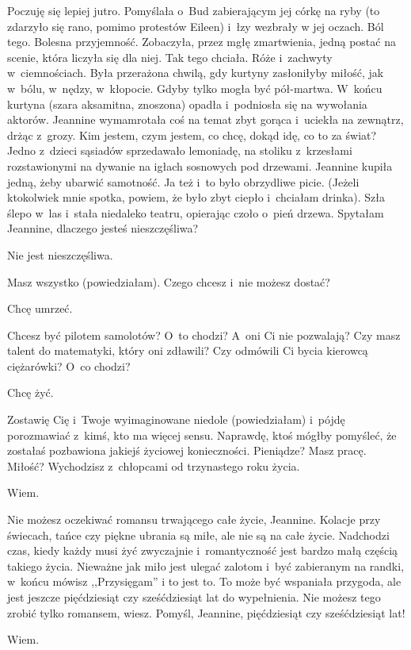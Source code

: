 \documentclass[oneside,polish,12pt,sfheadings]{mwbk}
\begin{document}
Poczuję się lepiej jutro. Pomyślała o~Bud zabierającym jej córkę na
ryby (to zdarzyło się rano, pomimo protestów Eileen) i~łzy wezbrały
w jej oczach. Ból tego. Bolesna przyjemność. Zobaczyła, przez mgłę
zmartwienia, jedną postać na scenie, która liczyła się dla niej. Tak
tego chciała. Róże i~zachwyty w~ciemnościach. Była przerażona chwilą,
gdy kurtyny zasłoniłyby miłość, jak w~bólu, w~nędzy, w~kłopocie. Gdyby
tylko mogła być pół-martwa. W~końcu kurtyna (szara aksamitna, znoszona)
opadła i~podniosła się na wywołania aktorów. Jeannine wymamrotała
coś na temat zbyt gorąca i~uciekła na zewnątrz, drżąc z~grozy. Kim
jestem, czym jestem, co chcę, dokąd idę, co to za świat? Jedno z~dzieci
sąsiadów sprzedawało lemoniadę, na stoliku z~krzesłami rozstawionymi
na dywanie na igłach sosnowych pod drzewami. Jeannine kupiła jedną,
żeby ubarwić samotność. Ja też i~to było obrzydliwe picie. (Jeżeli
ktokolwiek mnie spotka, powiem, że było zbyt ciepło i~chciałam drinka).
Szła ślepo w~las i~stała niedaleko teatru, opierając czoło o~pień
drzewa. Spytałam Jeannine, dlaczego jesteś nieszczęśliwa?

Nie jest nieszczęśliwa.

Masz wszystko (powiedziałam). Czego chcesz i~nie możesz dostać?

Chcę umrzeć.

Chcesz być pilotem samolotów? O~to chodzi? A~oni Ci nie pozwalają?
Czy masz talent do matematyki, który oni zdławili? Czy odmówili Ci
bycia kierowcą ciężarówki? O~co chodzi?

Chcę żyć.

Zostawię Cię i~Twoje wyimaginowane niedole (powiedziałam) i~pójdę
porozmawiać z~kimś, kto ma więcej sensu. Naprawdę, ktoś mógłby pomyśleć,
że zostałaś pozbawiona jakiejś życiowej konieczności. Pieniądze? Masz
pracę. Miłość? Wychodzisz z~chłopcami od trzynastego roku życia.

Wiem.

Nie możesz oczekiwać romansu trwającego całe życie, Jeannine. Kolacje
przy świecach, tańce czy piękne ubrania są miłe, ale nie są na całe
życie. Nadchodzi czas, kiedy każdy musi żyć zwyczajnie i~romantyczność
jest bardzo małą częścią takiego życia. Nieważne jak miło jest ulegać
zalotom i~być zabieranym na randki, w~końcu mówisz ,,Przysięgam''
i to jest to. To może być wspaniała przygoda, ale jest jeszcze pięćdziesiąt
czy sześćdziesiąt lat do wypełnienia. Nie możesz tego zrobić tylko
romansem, wiesz. Pomyśl, Jeannine, pięćdziesiąt czy sześćdziesiąt
lat!

Wiem.
\end{document}

